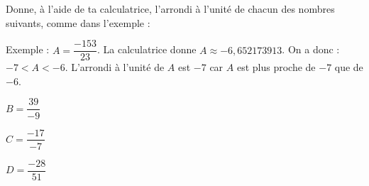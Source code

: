 \begin{exercice}Donne, à l'aide de ta calculatrice, l'arrondi à l'unité de chacun des nombres suivants, comme dans l'exemple :

Exemple : $A =\dfrac{-153}{23}$. La calculatrice donne $A \approx -6,652173913$. On a donc : $-7 < A < -6$. L'arrondi à l'unité de $A$ est $-7$ car $A$ est plus proche de $-7$ que de $-6$.

\vspace{.5em}

$B =\dfrac{39}{-9}$ 

$C = \dfrac{-17}{-7}$ 

$D = \dfrac{-28}{51}$ 
\end{exercice}
